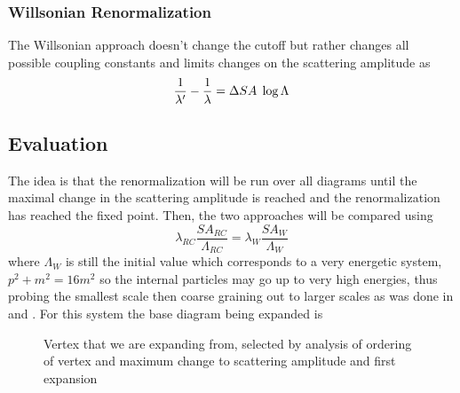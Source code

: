 \documentclass{article}
\begin{document}
\subsubsection{Willsonian Renormalization}
\hspace{0.5 cm} The Willsonian approach doesn't change the cutoff but rather changes all possible coupling constants and limits changes on the scattering amplitude as 
\begin{equation}
 \frac{1}{\lambda'} - \frac{1}{\lambda} = \Delta SA \hspace{0.1 cm} \log \Lambda
 \end{equation}

\subsection{Evaluation}
The idea is that the renormalization will be run over all diagrams until the maximal change in the scattering amplitude is reached and the renormalization has reached the fixed point. 
Then, the two approaches will be compared using 
\begin{equation}
	\lambda_{RC} \frac{SA_{RC}}{\Lambda_{RC}} = \lambda_W \frac{SA_{W}}{ \Lambda_W}
	\end{equation}
	where $\Lambda_W$ is still the initial value which corresponds to a very energetic system, $p^2 +m^2 = 16 m^2$ so the internal particles may go up to very high energies, thus probing the smallest scale then coarse graining out to larger scales as was done in \cite{Beny2013} and \cite{Mehta2014}.
For this system the base diagram being expanded is
\begin{figure}[h!]
\begin{center}
	\caption{Vertex that we are expanding from, selected by analysis of ordering of vertex and maximum change to scattering amplitude and first expansion}
	\end{center}
\end{figure} 
\end{document}
